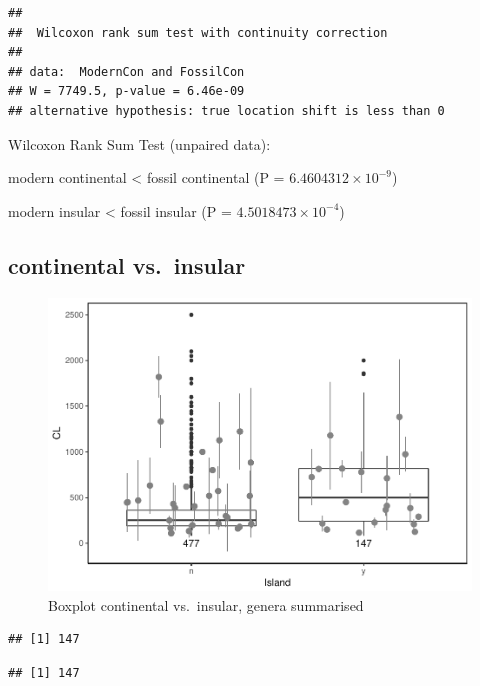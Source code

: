 \documentclass[]{article}
\begin{document}
\begin{verbatim}
## 
##  Wilcoxon rank sum test with continuity correction
## 
## data:  ModernCon and FossilCon
## W = 7749.5, p-value = 6.46e-09
## alternative hypothesis: true location shift is less than 0
\end{verbatim}

Wilcoxon Rank Sum Test (unpaired data):

modern continental \textless{} fossil continental (P =
\(6.4604312\times 10^{-9}\))

modern insular \textless{} fossil insular (P =
\(4.5018473\times 10^{-4}\))

\newpage

\subsection{continental vs.~insular}\label{continental-vs.insular-1}

\begin{figure}[htbp]
\centering
\includegraphics{MA_JJ_files/figure-latex/BPCI-1.pdf}
\caption{Boxplot continental vs.~insular, genera summarised}
\end{figure}

\begin{verbatim}
## [1] 147
\end{verbatim}

\begin{verbatim}
## [1] 147
\end{verbatim}
\end{document}
